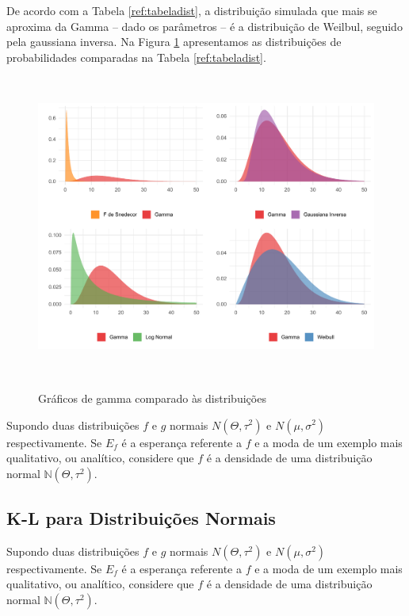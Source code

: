 De acordo com a Tabela \ref{ref:tabeladist}, a distribuição simulada que mais se aproxima da Gamma -- dado os parâmetros -- é a distribuição de Weilbul, seguido pela gaussiana inversa. Na Figura \ref{figcompa} apresentamos as distribuições de probabilidades comparadas na Tabela \ref{ref:tabeladist}.
\begin{figure}[!h]
    \centering
    \caption{Gráficos de gamma comparado às distribuições}
    \includegraphics[width=\textwidth, height=10cm]{capitulos/figures/grafgamma.pdf}
    \label{figcompa}
\end{figure}

Supondo duas distribuições $f$ e $g$ normais $N(\Theta, \tau^2)$ e $N(\mu, \sigma^2)$ respectivamente. Se $E_f$ é a esperança referente a $f$ e a moda de um exemplo mais qualitativo, ou analítico, considere que $f$ é a densidade de uma distribuição normal $\mathbb{N}(\Theta, \tau^2)$.

\subsection{K-L para Distribuições Normais}
\label{normal}

Supondo duas distribuições $f$ e $g$ normais $N(\Theta, \tau^2)$ e $N(\mu, \sigma^2)$ respectivamente. Se $E_f$ é a esperança referente a $f$ e a moda de um exemplo mais qualitativo, ou analítico, considere que $f$ é a densidade de uma distribuição normal $\mathbb{N}(\Theta, \tau^2)$.

